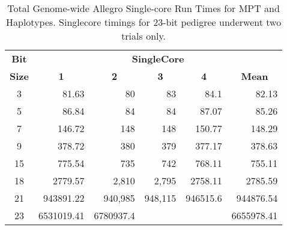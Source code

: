 \begin{table}[h]
\begin{center}
\begin{tabular}{crrrrr}\toprule
\textbf{Bit}  & \multicolumn{5}{c}{\textbf{SingleCore}}                                                                                                                                       \\
\textbf{Size} & \multicolumn{1}{c}{\textbf{1}} & \multicolumn{1}{c}{\textbf{2}} & \multicolumn{1}{c}{\textbf{3}} & \multicolumn{1}{c}{\textbf{4}} & \multicolumn{1}{c}{\textbf{Mean}} \\
\midrule
3             & 81.63                            & 80                               & 83                               & 84.1                             & 82.13                             \\
5             & 86.84                            & 84                               & 84                               & 87.07                            & 85.26                             \\
7             & 146.72                           & 148                              & 148                              & 150.77                           & 148.29                            \\
9             & 378.72                           & 380                              & 379                              & 377.17                           & 378.63                            \\
15            & 775.54                           & 735                              & 742                              & 768.11                           & 755.11                            \\
18            & 2779.57                          & 2,810                            & 2,795                            & 2758.11                          & 2785.59                           \\
21            & 943891.22                        & 940,985                          & 948,115                          & 946515.6                         & 944876.54                         \\
23            & 6531019.41                       & 6780937.4                        &                                  &                                  & 6655978.41                       \\
\hline
\end{tabular}
\end{center}
\vspace{-15pt}
\caption{Total Genome-wide Allegro Single-core Run Times for MPT and Haplotypes. Singlecore timings for 23-bit pedigree underwent two trials only.}\label{table:res:allegrosingleruntimes}
\end{table}


